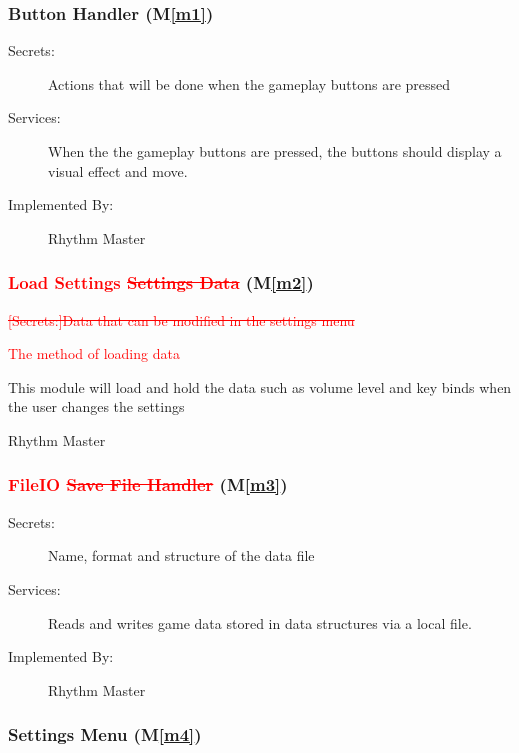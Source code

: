 \documentclass[12pt, titlepage]{article}
\newcommand{\mref}[1]{M\ref{#1}}
\begin{document}
\subsubsection{Button Handler (\mref{m1})}

\begin{description}
\item[Secrets:]Actions that will be done when the gameplay buttons are pressed
\item[Services:]When the the gameplay buttons are pressed, the buttons should display a visual effect and move.
\item[Implemented By:] Rhythm Master
\end{description}

\subsubsection{\textcolor{red}{Load Settings} \textcolor{red}{\sout{Settings Data}} (\mref{m2})}

\begin{description}
\item\textcolor{red}{\sout{[Secrets:]Data that can be modified in the settings menu}}
\item[Secrets:]\textcolor{red}{The method of loading data}
\item[Services:]This module will load and hold the data such as volume level and key binds when the user changes the settings
\item[Implemented By:] Rhythm Master
\end{description}

\subsubsection{\textcolor{red}{FileIO} \textcolor{red}{\sout{Save File Handler}} (\mref{m3})}

\begin{description}
\item[Secrets:]Name, format and structure of the data file
\item[Services:]Reads and writes game data stored in data structures via a local file.
\item[Implemented By:] Rhythm Master
\end{description}

\subsubsection{Settings Menu (\mref{m4})}
\end{document}
